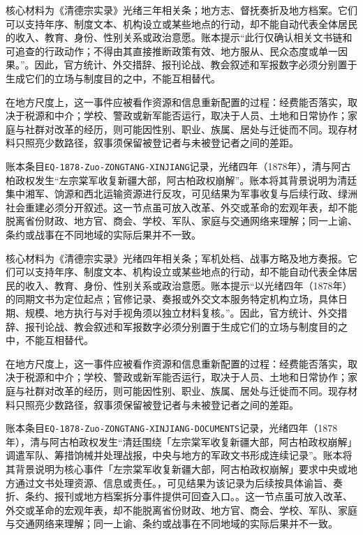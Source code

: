 核心材料为《清德宗实录》光绪三年相关条；地方志、督抚奏折及地方档案。它们可以支持年序、制度文本、机构设立或某些地点的行动，却不能自动代表全体居民的收入、教育、身份、性别关系或政治意愿。账本提示“此行仅确认相关文书链和可追查的行政动作；不得由其直接推断政策有效、地方服从、民众态度或单一因果。”。因此，官方统计、外交措辞、报刊论战、教会叙述和军报数字必须分别置于生成它们的立场与制度目的之中，不能互相替代。

在地方尺度上，这一事件应被看作资源和信息重新配置的过程：经费能否落实，取决于税源和中介；学校、警政或新军能否运行，取决于人员、土地和日常协作；家庭与社群对改革的经历，则可能因性别、职业、族属、居处与迁徙而不同。现存材料只照亮少数路径，叙事须保留被登记者与未被登记者之间的差距。

账本条目\texttt{EQ-1878-Zuo-ZONGTANG-XINJIANG}记录，光绪四年（1878年），清与阿古柏政权发生“左宗棠军收复新疆大部，阿古柏政权崩解”。账本将其背景说明为清廷集中湘军、饷源和西北运输资源进行反攻，可见结果为军事收复与后续行政、绿洲社会重建必须分开叙述。这一节点虽可放入改革、外交或革命的宏观年表，却不能脱离省份财政、地方官、商会、学校、军队、家庭与交通网络来理解；同一上谕、条约或战事在不同地域的实际后果并不一致。

核心材料为《清德宗实录》光绪四年相关条；军机处档、战事方略及地方奏报。它们可以支持年序、制度文本、机构设立或某些地点的行动，却不能自动代表全体居民的收入、教育、身份、性别关系或政治意愿。账本提示“以光绪四年（1878年）的同期文书为定位起点；官修记录、奏报或外交文本服务特定机构立场，具体日期、规模、地方执行与对手视角须以独立材料复核。”。因此，官方统计、外交措辞、报刊论战、教会叙述和军报数字必须分别置于生成它们的立场与制度目的之中，不能互相替代。

在地方尺度上，这一事件应被看作资源和信息重新配置的过程：经费能否落实，取决于税源和中介；学校、警政或新军能否运行，取决于人员、土地和日常协作；家庭与社群对改革的经历，则可能因性别、职业、族属、居处与迁徙而不同。现存材料只照亮少数路径，叙事须保留被登记者与未被登记者之间的差距。

账本条目\texttt{EQ-1878-Zuo-ZONGTANG-XINJIANG-DOCUMENTS}记录，光绪四年（1878年），清与阿古柏政权发生“清廷围绕「左宗棠军收复新疆大部，阿古柏政权崩解」调遣军队、筹措饷械并处理战报，中央与地方的军政文书形成连续记录”。账本将其背景说明为核心事件「左宗棠军收复新疆大部，阿古柏政权崩解」要求中央或地方通过文书处理资源、信息或责任。，可见结果为该记录为后续按具体谕旨、奏折、条约、报刊或地方档案拆分事件提供可回查入口。。这一节点虽可放入改革、外交或革命的宏观年表，却不能脱离省份财政、地方官、商会、学校、军队、家庭与交通网络来理解；同一上谕、条约或战事在不同地域的实际后果并不一致。

